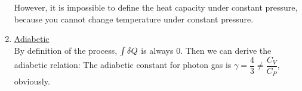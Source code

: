 \documentclass[class=article, crop=false, 12pt]{standalone}
\begin{document}
\begin{example}
\begin{enumerate}
        However, it is impossible to define the heat capacity under constant pressure, 
        because you cannot change temperature under constant pressure.

        \item \ul{Adiabetic}\\
        By definition of the process, $\int \var{Q}$ is always $0$.
        Then we can derive the adiabetic relation:
        The adiabetic constant for photon gas is $\gamma =\dfrac{4}{3} \neq \dfrac{C_V}{C_P}$, obviously.

    \end{enumerate}

\end{example}
\end{document}
